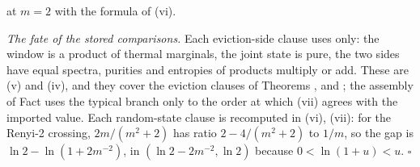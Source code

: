 at $m = 2$ with the formula of (vi).

\emph{The fate of the stored comparisons.} Each eviction-side clause uses only: the window is a product of thermal marginals, the joint state is pure, the two sides have equal spectra, purities and entropies of products multiply or add. These are (v) and (iv), and they cover the eviction clauses of Theorems ,  and ; the assembly of Fact  uses the typical branch only to the order at which (vii) agrees with the imported value. Each random-state clause is recomputed in (vi), (vii): for the Renyi-2 crossing, $2m/(m^{2}+2)$ has ratio $2 - 4/(m^{2}+2)$ to $1/m$, so the gap is $\ln 2 - \ln(1 + 2m^{-2})$, in $(\ln 2 - 2m^{-2}, \ln 2)$ because $0 < \ln(1+u) < u$. $\square$
